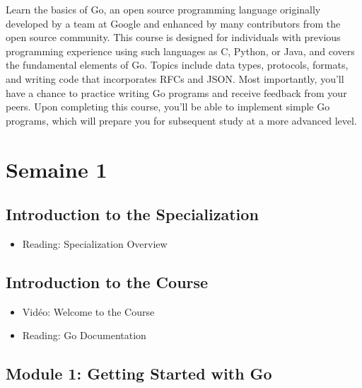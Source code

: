 



Learn the basics of Go, an open source programming language originally developed by a team at Google and enhanced by many contributors from the open source community. This course is designed for individuals with previous programming experience using such languages as C, Python, or Java, and covers the fundamental elements of Go. Topics include data types, protocols, formats, and writing code that incorporates RFCs and JSON. Most importantly, you’ll have a chance to practice writing Go programs and receive feedback from your peers. Upon completing this course, you'll be able to implement simple Go programs, which will prepare you for subsequent study at a more advanced level.

\section*{Semaine 1}

\subsection*{Introduction to the Specialization}

\begin{itemize}[label={$\bullet$}]
  \item Reading: Specialization Overview
\end{itemize}    

\subsection*{Introduction to the Course}

\begin{itemize}[label={$\bullet$}]
  \item Vidéo: Welcome to the Course
  \item Reading: Go Documentation
\end{itemize}

\subsection*{Module 1: Getting Started with Go}

